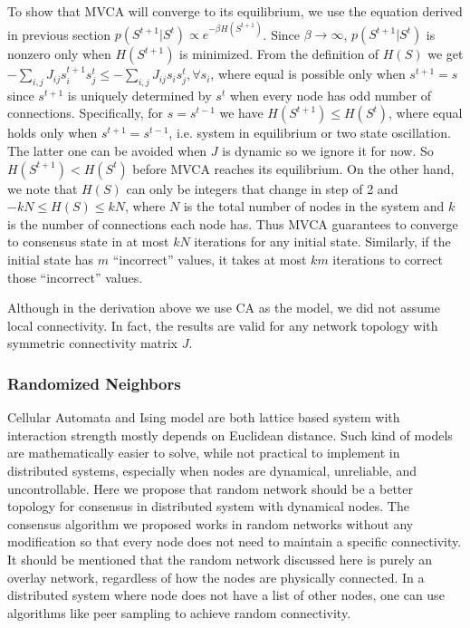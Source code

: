 \documentclass[reprint,pre,aps]{revtex4-1}
\begin{document}
To show that MVCA will converge to its equilibrium, we use the equation derived in previous section $p(S^{t+1} | S^{t}) \propto e^{-\beta H(S^{t+1})}$. Since $\beta \to \infty$, $p(S^{t+1} | S^{t})$ is nonzero only when $H(S^{t+1})$ is minimized. From the definition of $H(S)$ we get $ -\sum_{i,j} J_{ij} s^{t+1}_i s^t_j \leq -\sum_{i,j} J_{ij} s_i s^t_j, \forall s_i$, where equal is possible only when $s^{t+1} = s$ since $s^{t+1}$ is uniquely determined by $s^t$ when every node has odd number of connections. Specifically, for $s = s^{t-1}$ we have $H(S^{t+1}) \leq H(S^t)$, where equal holds only when $s^{t+1} = s^{t-1}$, i.e. system in equilibrium or two state oscillation. The latter one can be avoided when $J$ is dynamic so we ignore it for now. So $H(S^{t+1}) < H(S^t)$ before MVCA reaches its equilibrium. On the other hand, we note that $H(S)$ can only be integers that change in step of 2 and $-kN \leq H(S) \leq kN$, where $N$ is the total number of nodes in the system and $k$ is the number of connections each node has. Thus MVCA guarantees to converge to consensus state in at most $kN$ iterations for any initial state. Similarly, if the initial state has $m$ ``incorrect'' values, it takes at most $km$ iterations to correct those ``incorrect'' values.

Although in the derivation above we use CA as the model, we did not assume local connectivity. In fact, the results are valid for any network topology with symmetric connectivity matrix $J$.

\subsubsection{Randomized Neighbors}

Cellular Automata and Ising model are both lattice based system with interaction strength mostly depends on Euclidean distance. Such kind of models are mathematically easier to solve, while not practical to implement in distributed systems, especially when nodes are dynamical, unreliable, and uncontrollable. Here we propose that random network should be a better topology for consensus in distributed system with dynamical nodes. The consensus algorithm we proposed works in random networks without any modification so that every node does not need to maintain a specific connectivity. It should be mentioned that the random network discussed here is purely an overlay network, regardless of how the nodes are physically connected. In a distributed system where node does not have a list of other nodes, one can use algorithms like peer sampling to achieve random connectivity.
\end{document}
